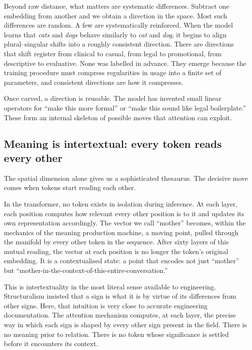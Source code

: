 Beyond raw distance, what matters are systematic differences. Subtract one embedding from another and we obtain a direction in the space. Most such differences are random. A few are systematically reinforced. When the model learns that \emph{cats} and \emph{dogs} behave similarly to \emph{cat} and \emph{dog}, it begins to align plural--singular shifts into a roughly consistent direction. There are directions that shift register from clinical to casual, from legal to promotional, from descriptive to evaluative. None was labelled in advance. They emerge because the training procedure must compress regularities in usage into a finite set of parameters, and consistent directions are how it compresses.

Once carved, a direction is reusable. The model has invented small linear operators for ``make this more formal'' or ``make this sound like legal boilerplate.'' These form an internal skeleton of possible moves that attention can exploit.

\subsection{Meaning is intertextual: every token reads every other}

The spatial dimension alone gives us a sophisticated thesaurus. The decisive move comes when tokens start reading each other.

In the transformer, no token exists in isolation during inference. At each layer, each position computes how relevant every other position is to it and updates its own representation accordingly. The vector we call ``mother'' becomes, within the mechanics of the meaning production machine, a moving point, pulled through the manifold by every other token in the sequence. After sixty layers of this mutual reading, the vector at each position is no longer the token's original embedding. It is a contextualised state: a point that encodes not just ``mother'' but ``mother-in-the-context-of-this-entire-conversation.''

This is intertextuality in the most literal sense available to engineering. Structuralism insisted that a sign is what it is by virtue of its differences from other signs. Here, that intuition is very close to accurate engineering documentation. The attention mechanism computes, at each layer, the precise way in which each sign is shaped by every other sign present in the field. There is no meaning prior to relation. There is no token whose significance is settled before it encounters its context.

